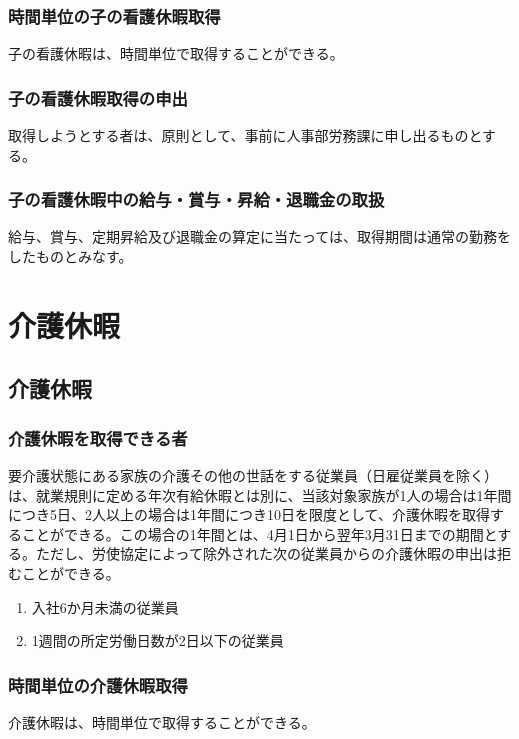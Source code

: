 \documentclass{jsarticle}
\begin{document}
\subsubsection{時間単位の子の看護休暇取得}
\label{育介_項_時間単位の子の看護休暇取得}
子の看護休暇は、時間単位で取得することができる。

\subsubsection{子の看護休暇取得の申出}
\label{育介_項_子の看護休暇取得の申出}
取得しようとする者は、原則として、事前に人事部労務課に申し出るものとする。 

\subsubsection{子の看護休暇中の給与・賞与・昇給・退職金の取扱}
\label{育介_項_子の看護休暇中の給与・賞与・昇給・退職金の取扱}
給与、賞与、定期昇給及び退職金の算定に当たっては、取得期間は通常の勤務をしたものとみなす。

\section{介護休暇}

\subsection{介護休暇}
\label{育介_条_介護休暇}

\subsubsection{介護休暇を取得できる者}
\label{育介_項_介護休暇を取得できる者}
要介護状態にある家族の介護その他の世話をする従業員（日雇従業員を除く）は、就業規則に定める年次有給休暇とは別に、当該対象家族が1人の場合は1年間につき5日、2人以上の場合は1年間につき10日を限度として、介護休暇を取得することができる。この場合の1年間とは、4月1日から翌年3月31日までの期間とする。ただし、労使協定によって除外された次の従業員からの介護休暇の申出は拒むことができる。
\begin{enumerate}
  \item 入社6か月未満の従業員
  \item 1週間の所定労働日数が2日以下の従業員 
\end{enumerate}

\subsubsection{時間単位の介護休暇取得}
\label{育介_項_時間単位の介護休暇取得}
介護休暇は、時間単位で取得することができる。
\end{document}
